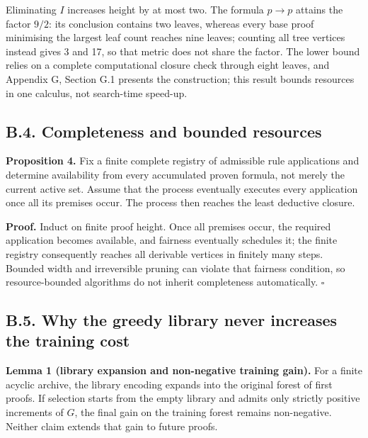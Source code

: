 \documentclass[pdflatex,sn-basic,Numbered]{sn-jnl}
\begin{document}
Eliminating \(I\) increases height by at most two. The formula \(p \rightarrow p\) attains the factor \(9/2\): its conclusion contains two leaves, whereas every base proof minimising the largest leaf count reaches nine leaves; counting all tree vertices instead gives 3 and 17, so that metric does not share the factor. The lower bound relies on a complete computational closure check through eight leaves, and Appendix G, Section G.1 presents the construction; this result bounds resources in one calculus, not search-time speed-up.

\subsection*{B.4. Completeness and bounded resources}\label{b.4.-completeness-and-bounded-resources}

\textbf{Proposition 4.} Fix a finite complete registry of admissible rule applications and determine availability from every accumulated proven formula, not merely the current active set. Assume that the process eventually executes every application once all its premises occur. The process then reaches the least deductive closure.

\textbf{Proof.} Induct on finite proof height. Once all premises occur, the required application becomes available, and fairness eventually schedules it; the finite registry consequently reaches all derivable vertices in finitely many steps. Bounded width and irreversible pruning can violate that fairness condition, so resource-bounded algorithms do not inherit completeness automatically. \(\square\)

\subsection*{B.5. Why the greedy library never increases the training cost}\label{b.5.-why-the-greedy-library-never-increases-the-training-cost}

\textbf{Lemma 1 (library expansion and non-negative training gain).} For a finite acyclic archive, the library encoding expands into the original forest of first proofs. If selection starts from the empty library and admits only strictly positive increments of \(G\), the final gain on the training forest remains non-negative. Neither claim extends that gain to future proofs.
\end{document}
